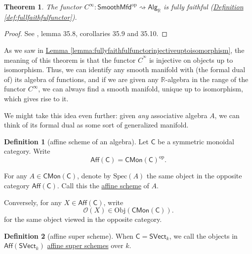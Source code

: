 \documentclass[a4paper,10pt]{scrreprt}
\newcommand{\R}{\mathbb{R}}
\newcommand{\defn}[1]{\ul{#1}}
\newcommand{\Obj}{\mathrm{Obj}}
\newcommand{\Spec}{\mathrm{Spec}}
\theoremstyle{definition}
\newtheorem{definition}{Definition}[section]
\theoremstyle{plain}
\newtheorem{theorem}{Theorem}[section]
\theoremstyle{remark}
\begin{document}
\begin{theorem}
  The functor $C^{\infty}\colon \mathsf{SmoothMfd}^{\mathrm{op}} \rightsquigarrow \mathsf{Alg}_{\R}$ is fully faithful (\hyperref[def:fullfaithfulfunctor]{Definition \ref*{def:fullfaithfulfunctor}}).
\end{theorem}
\begin{proof}
  See \cite{KMS-natural-operations-differential-geometry}, lemma 35.8, corollaries 35.9 and 35.10.
\end{proof}

As we saw in \hyperref[lemma:fullyfaithfulfunctorinjectiveuptoisomorphism]{Lemma \ref*{lemma:fullyfaithfulfunctorinjectiveuptoisomorphism}}, the meaning of this theorem is that the functor $C^{^\infty}$ is injective on objects up to isomorphism. Thus, we can identify any smooth manifold with (the formal dual of) its algebra of functions, and if we are given any $\R$-algebra in the range of the functor $C^{\infty}$, we can always find a smooth manifold, unique up to isomorphism, which gives rise to it.

We might take this idea even further: given \emph{any} associative algebra $A$, we can think of its formal dual as some sort of generalized manifold. 

\begin{definition}[affine scheme of an algebra]
  \label{def:affineschemeofanalgebra}
  Let $\mathsf{C}$ be a symmetric monoidal category. Write
  \begin{equation*}
    \mathsf{Aff}(\mathsf{C}) = \mathsf{CMon}(\mathsf{C})^{\text{op}}.
  \end{equation*}

  For any $A \in \mathsf{CMon}(\mathsf{C})$, denote by $\Spec(A)$ the same object in the opposite category $\mathsf{Aff}(\mathsf{C})$. Call this the \defn{affine scheme} of $A$.

  Conversely, for any $X \in \mathsf{Aff}(\mathsf{C})$, write 
  \begin{equation*}
    \mathscr{O}(X) \in \Obj(\mathsf{CMon}(\mathsf{C})).
  \end{equation*}
  for the same object viewed in the opposite category.
\end{definition}

\begin{definition}[affine super scheme]
  \label{def:affinesuperscheme}
  When $\mathsf{C} = \mathsf{SVect}_{k}$, we call the objects in $\mathsf{Aff}(\mathsf{SVect}_{k})$ \defn{affine super schemes} over $k$.
\end{definition}
\end{document}
